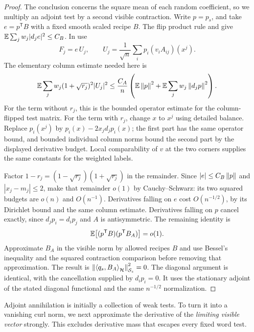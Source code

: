 \begin{proof}
The conclusion concerns the square mean of each random coefficient, so
we multiply an adjoint test by a second visible contraction.  Write
$p=p_s$, and take $e=p^{\mathsf T}B$ with a fixed smooth scaled recipe $B$.  The flip product rule and
 give
$\mathbb E\sum_jw_j|d_je|^2\le C_B$.
In  use
\[
 F_j=e\,U_j,\qquad
 U_j=\frac1{\sqrt n}\sum_i p_i(v_iA_{ij})(x^j).
\]
The elementary column estimate needed here is
\begin{equation}\label{eq:exact-column-budget}
 \mathbb E\sum_jw_j(1+\sqrt{r_j})^2|U_j|^2
 \le\frac{C_A}{n}
 \left(\mathbb E\left\lVert p\right\rVert^2+\mathbb E\sum_jw_j\left\lVert d_jp\right\rVert^2\right).
\end{equation}
For the term without $r_j$, this is the bounded operator estimate for
the column-flipped test matrix.  For the term with $r_j$, change $x$ to
$x^j$ using detailed balance.  Replace
$p_i(x^j)$ by $p_i(x)-2x_jd_jp_i(x)$; the first part has the same
operator bound, and bounded individual column norms bound the second
part by the displayed derivative budget.  Local comparability of $v$
at the two corners supplies the same constants for the weighted labels.

Factor $1-r_j=(1-\sqrt{r_j})(1+\sqrt{r_j})$ in the remainder.
Since $|e|\le C_B\left\lVert p\right\rVert$ and $|x_j-m_j|\le2$,
 make that remainder
$o(1)$ by Cauchy--Schwarz: its two squared budgets are $o(n)$ and
$O(n^{-1})$.  Derivatives falling on $e$ cost $O(n^{-1/2})$, by its
Dirichlet bound and the same column estimate.  Derivatives falling on
$p$ cancel exactly, since $d_jp_i=d_ip_j$ and $A$ is antisymmetric.
The remaining identity is
\[
 \mathbb E\bigl[(p^{\mathsf T}B)(p^{\mathsf T}B_A)\bigr]=o(1).
\]
Approximate $B_A$ in the visible norm by allowed recipes $B$ and use
Bessel's inequality and the squared contraction comparison before
removing that approximation.  The result is
$\left\lVert \left\langle q_s,B_A\right\rangle_{\mathcal H}\right\rVert_{\mathcal S_s}^2=0$.
The diagonal argument is identical, with the cancellation supplied by
$d_ip_i=0$.  It uses the stationary adjoint of the stated diagonal
functional and the same $n^{-1/2}$ normalization.
\end{proof}

Adjoint annihilation is initially a collection of weak tests.  To turn
it into a vanishing curl norm, we next approximate the derivative of the
\emph{limiting visible vector} strongly.  This excludes derivative mass
that escapes every fixed word test.

